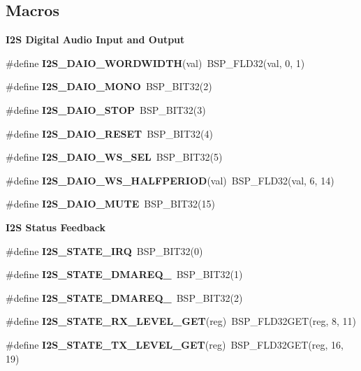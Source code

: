 \subsection*{Macros}
\begin{Indent}\textbf{ I2S Digital Audio Input and Output}\par
\begin{DoxyCompactItemize}
\item 
\#define {\bfseries I2\+S\+\_\+\+D\+A\+I\+O\+\_\+\+W\+O\+R\+D\+W\+I\+D\+TH}(val)~B\+S\+P\+\_\+\+F\+L\+D32(val, 0, 1)
\item 
\#define {\bfseries I2\+S\+\_\+\+D\+A\+I\+O\+\_\+\+M\+O\+NO}~B\+S\+P\+\_\+\+B\+I\+T32(2)
\item 
\#define {\bfseries I2\+S\+\_\+\+D\+A\+I\+O\+\_\+\+S\+T\+OP}~B\+S\+P\+\_\+\+B\+I\+T32(3)
\item 
\#define {\bfseries I2\+S\+\_\+\+D\+A\+I\+O\+\_\+\+R\+E\+S\+ET}~B\+S\+P\+\_\+\+B\+I\+T32(4)
\item 
\#define {\bfseries I2\+S\+\_\+\+D\+A\+I\+O\+\_\+\+W\+S\+\_\+\+S\+EL}~B\+S\+P\+\_\+\+B\+I\+T32(5)
\item 
\#define {\bfseries I2\+S\+\_\+\+D\+A\+I\+O\+\_\+\+W\+S\+\_\+\+H\+A\+L\+F\+P\+E\+R\+I\+OD}(val)~B\+S\+P\+\_\+\+F\+L\+D32(val, 6, 14)
\item 
\#define {\bfseries I2\+S\+\_\+\+D\+A\+I\+O\+\_\+\+M\+U\+TE}~B\+S\+P\+\_\+\+B\+I\+T32(15)
\end{DoxyCompactItemize}
\end{Indent}
\begin{Indent}\textbf{ I2S Status Feedback}\par
\begin{DoxyCompactItemize}
\item 
\#define {\bfseries I2\+S\+\_\+\+S\+T\+A\+T\+E\+\_\+\+I\+RQ}~B\+S\+P\+\_\+\+B\+I\+T32(0)
\item 
\#define {\bfseries I2\+S\+\_\+\+S\+T\+A\+T\+E\+\_\+\+D\+M\+A\+R\+E\+Q\+\_}~B\+S\+P\+\_\+\+B\+I\+T32(1)
\item 
\#define {\bfseries I2\+S\+\_\+\+S\+T\+A\+T\+E\+\_\+\+D\+M\+A\+R\+E\+Q\+\_}~B\+S\+P\+\_\+\+B\+I\+T32(2)
\item 
\#define {\bfseries I2\+S\+\_\+\+S\+T\+A\+T\+E\+\_\+\+R\+X\+\_\+\+L\+E\+V\+E\+L\+\_\+\+G\+ET}(reg)~B\+S\+P\+\_\+\+F\+L\+D32\+G\+ET(reg, 8, 11)
\item 
\#define {\bfseries I2\+S\+\_\+\+S\+T\+A\+T\+E\+\_\+\+T\+X\+\_\+\+L\+E\+V\+E\+L\+\_\+\+G\+ET}(reg)~B\+S\+P\+\_\+\+F\+L\+D32\+G\+ET(reg, 16, 19)
\end{DoxyCompactItemize}
\end{Indent}
